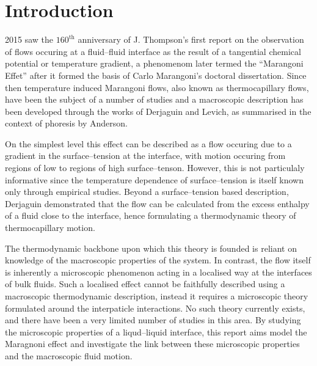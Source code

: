 \section{Introduction}
2015 saw the $160^{\mathrm{th}}$ anniversary of J. Thompson's first report\cite{JThompson} on the observation of flows occuring at a fluid--fluid interface as the result of a tangential chemical potential or temperature gradient, a phenomenom later termed the ``Marangoni Effet'' after it formed the basis of Carlo Marangoni's doctoral dissertation.\cite{Marangoni}
Since then temperature induced Marangoni flows, also known as thermocapillary flows, have been the subject of a number of studies and a macroscopic description has been developed through the works of Derjaguin\cite{SurfaceForces} and Levich\cite{Levich}, as summarised in the context of phoresis by Anderson\cite{Anderson}.

On the simplest level this effect can be described as a flow occuring due to a gradient in the surface--tension at the interface, with motion occuring from regions of low to regions of high surface--tenson.
However, this is not particulaly informative since the temperature dependence of surface--tension is itself known only through empirical studies.
Beyond a surface--tension based description, Derjaguin demonstrated that the flow can be calculated from the excess enthalpy of a fluid close to the interface, hence formulating a thermodynamic theory of thermocapillary motion.\cite{SurfaceForces}

The thermodynamic backbone upon which this theory is founded is reliant on knowledge of the macroscopic properties of the system.
In contrast, the flow itself is inherently a microscopic phenomenon acting in a localised way at the interfaces of bulk fluids. 
Such a localised effect cannot be faithfully described using a macroscopic thermodynamic description, instead it requires a microscopic theory formulated around the interpaticle interactions. 
No such theory currently exists, and there have been a very limited number of studies in this area.\cite{HolgerBoppHampe}
By studying the microscopic properties of a liqud--liquid interface, this report aims model the Maragnoni effect and investigate the link between these microscopic properties and the macroscopic fluid motion.

